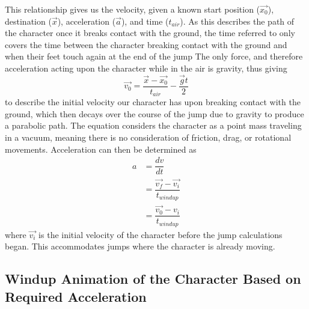 This relationship gives us the velocity, given a known start position ($\vec{x_0}$), destination ($\vec{x}$), acceleration ($\vec{a}$), and time ($t_{air}$).  As this describes the path of the character once it breaks contact with the ground, the time referred to only covers the time between the character breaking contact with the ground and when their feet touch again at the end of the jump  The only force, and therefore acceleration acting upon the character while in the air is gravity, thus giving 
\[ \vec{v_0} = \dfrac{\vec{x} - \vec{x_0}}{t_{air}} - \dfrac{\vec{g}t}{2} \]
to describe the initial velocity our character has upon breaking contact with the ground, which then decays over the course of the jump due to gravity to produce a parabolic path.  The equation considers the character as a point mass traveling in a vacuum, meaning there is no consideration of friction, drag, or rotational movements.  Acceleration can then be determined as 
\begin{align*}
	a &= \dfrac{dv}{dt} \\
	&= \dfrac{\vec{v_f} - \vec{v_i}}{t_{windup}} \\
	&= \dfrac{\vec{v_0} - {v_i}}{t_{windup}}
\end{align*}
where $\vec{v_i}$ is the initial velocity of the character before the jump calculations began.  This accommodates jumps where the character is already moving.


\subsection{Windup Animation of the Character Based on Required Acceleration}
\label{subsection:torque_windup}

